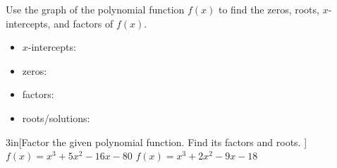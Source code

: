 \begin{myProblemsWithContent}{1}{%
    Use the graph of the polynomial function $f(x)$ to find the zeros, roots, $x$-intercepts, and factors 
    of $f(x)$.
    }
    \begin{minipage}{0.3\textwidth}
        \begin{center}
        \end{center}
    \end{minipage}

    \tcblower

    \begin{itemize}
        \item $x$-intercepts:\quad \underline{\hspace{3in}}
        \item zeros:\quad \underline{\hspace{3in}}
        \item factors:\quad \underline{\hspace{3in}}
        \item roots/solutions:\quad \underline{\hspace{3in}}
    \end{itemize}
\end{myProblemsWithContent}

\begin{my2Problems}{3in}[Factor the given polynomial function. Find its factors and roots. ]
    {
        $f(x) = x^3 + 5x^2 - 16x - 80$
    }
    {
        $f(x) = x^3 + 2x^2 - 9x - 18$
    }
\end{my2Problems}